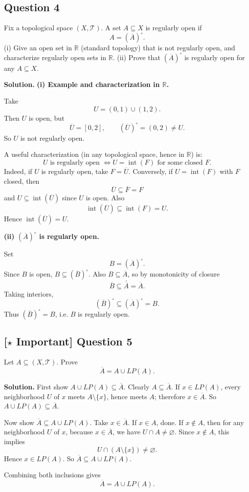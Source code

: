 \documentclass{article}
\newcommand{\R}{\mathbb{R}}
\newcommand{\important}{\texorpdfstring{\textbf{[\(\star\) Important]}}{[Important]}}
\newenvironment{solution}{\par\noindent\textbf{Solution.}\quad}{\par}
\begin{document}
\subsection{Question 4}

Fix a topological space $(X,\mathcal{T})$. A set $A\subseteq X$ is regularly open if
\[
A=(\overline A)^\circ.
\]
(i) Give an open set in $\R$ (standard topology) that is not regularly open, and characterize regularly open sets in $\R$.
(ii) Prove that $(\overline A)^\circ$ is regularly open for any $A\subseteq X$.

\begin{solution}
\textbf{(i) Example and characterization in $\R$.}

Take
\[
U=(0,1)\cup(1,2).
\]
Then $U$ is open, but
\[
\overline U=[0,2],\qquad (\overline U)^\circ=(0,2)\neq U.
\]
So $U$ is not regularly open.

A useful characterization (in any topological space, hence in $\R$) is:
\[
U\text{ is regularly open }\Longleftrightarrow U=\operatorname{int}(F)\text{ for some closed }F.
\]
Indeed, if $U$ is regularly open, take $F=\overline U$.
Conversely, if $U=\operatorname{int}(F)$ with $F$ closed, then
\[
\overline U\subseteq\overline F=F
\]
and $U\subseteq\operatorname{int}(\overline U)$ since $U$ is open. Also
\[
\operatorname{int}(\overline U)\subseteq\operatorname{int}(F)=U.
\]
Hence $\operatorname{int}(\overline U)=U$.

\textbf{(ii) $(\overline A)^\circ$ is regularly open.}

Set
\[
B=(\overline A)^\circ.
\]
Since $B$ is open, $B\subseteq(\overline B)^\circ$.
Also $B\subseteq\overline A$, so by monotonicity of closure
\[
\overline B\subseteq\overline{\overline A}=\overline A.
\]
Taking interiors,
\[
(\overline B)^\circ\subseteq(\overline A)^\circ=B.
\]
Thus $(\overline B)^\circ=B$, i.e. $B$ is regularly open.
\end{solution}

\subsection{\important{} Question 5}

Let $A\subseteq(X,\mathcal{T})$. Prove
\[
\overline A=A\cup LP(A).
\]

\begin{solution}
First show $A\cup LP(A)\subseteq\overline A$.
Clearly $A\subseteq\overline A$.
If $x\in LP(A)$, every neighborhood $U$ of $x$ meets $A\setminus\{x\}$, hence meets $A$; therefore $x\in\overline A$.
So $A\cup LP(A)\subseteq\overline A$.

Now show $\overline A\subseteq A\cup LP(A)$.
Take $x\in\overline A$.
If $x\in A$, done.
If $x\notin A$, then for any neighborhood $U$ of $x$, because $x\in\overline A$, we have $U\cap A\neq\varnothing$.
Since $x\notin A$, this implies
\[
U\cap(A\setminus\{x\})\neq\varnothing.
\]
Hence $x\in LP(A)$.
So $\overline A\subseteq A\cup LP(A)$.

Combining both inclusions gives
\[
\overline A=A\cup LP(A).
\]
\end{solution}
\end{document}
